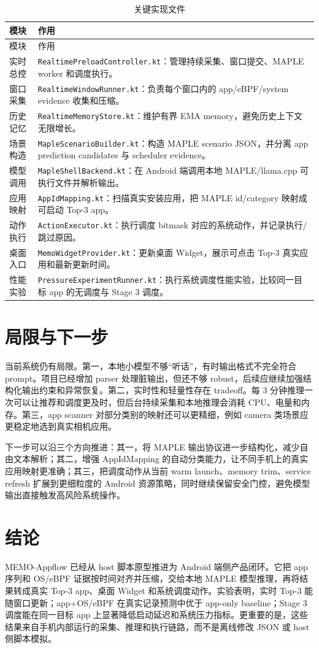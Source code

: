 \begin{longtable}{p{} p{}}
\caption{关键实现文件}\\
\toprule
模块 & 作用 \\
\midrule
\endfirsthead
\toprule
模块 & 作用 \\
\midrule
\endhead
实时总控 & \texttt{RealtimePreloadController.kt}：管理持续采集、窗口提交、MAPLE worker 和调度执行。\\
窗口采集 & \texttt{RealtimeWindowRunner.kt}：负责每个窗口内的 app/eBPF/system evidence 收集和压缩。\\
历史记忆 & \texttt{RealtimeMemoryStore.kt}：维护有界 EMA memory，避免历史上下文无限增长。\\
场景构造 & \texttt{MapleScenarioBuilder.kt}：构造 MAPLE scenario JSON，并分离 app prediction candidates 与 scheduler evidence。\\
模型调用 & \texttt{MapleShellBackend.kt}：在 Android 端调用本地 MAPLE/llama.cpp 可执行文件并解析输出。\\
应用映射 & \texttt{AppIdMapping.kt}：扫描真实安装应用，把 MAPLE id/category 映射成可启动 Top-3 app。\\
动作执行 & \texttt{ActionExecutor.kt}：执行调度 bitmask 对应的系统动作，并记录执行/跳过原因。\\
桌面入口 & \texttt{MemoWidgetProvider.kt}：更新桌面 Widget，展示可点击 Top-3 真实应用和最新更新时间。\\
性能实验 & \texttt{PressureExperimentRunner.kt}：执行系统调度性能实验，比较同一目标 app 的无调度与 Stage 3 调度。\\
\bottomrule
\end{longtable}

\section{局限与下一步}

当前系统仍有局限。第一，本地小模型不够“听话”，有时输出格式不完全符合 prompt。项目已经增加 parser 处理脏输出，但还不够 robust，后续应继续加强结构化输出约束和异常恢复。第二，实时性和轻量性存在 tradeoff。每 3 分钟推理一次可以让推荐和调度更及时，但后台持续采集和本地推理会消耗 CPU、电量和内存。第三，app scanner 对部分类别的映射还可以更精细，例如 camera 类场景应更稳定地选到真实相机应用。

下一步可以沿三个方向推进：其一，将 MAPLE 输出协议进一步结构化，减少自由文本解析；其二，增强 AppIdMapping 的自动分类能力，让不同手机上的真实应用映射更准确；其三，把调度动作从当前 warm launch、memory trim、service refresh 扩展到更细粒度的 Android 资源策略，同时继续保留安全门控，避免模型输出直接触发高风险系统操作。

\section{结论}

MEMO-Appflow 已经从 host 脚本原型推进为 Android 端侧产品闭环。它把 app 序列和 OS/eBPF 证据按时间对齐并压缩，交给本地 MAPLE 模型推理，再将结果转成真实 Top-3 app、桌面 Widget 和系统调度动作。实验表明，实时 Top-3 能随窗口更新；app+OS/eBPF 在真实记录预测中优于 app-only baseline；Stage 3 调度能在同一目标 app 上显著降低启动延迟和系统压力指标。更重要的是，这些结果来自手机内部运行的采集、推理和执行链路，而不是离线修改 JSON 或 host 侧脚本模拟。
